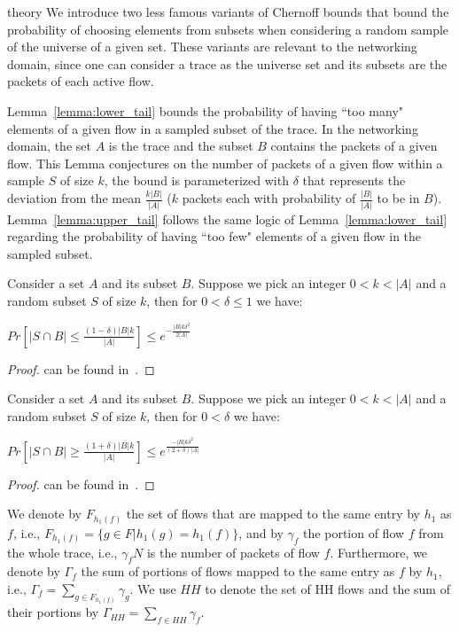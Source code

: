 \begin{maybeappendix}{theory}
We introduce two less famous variants of Chernoff bounds that bound the probability of choosing elements from subsets when considering a random sample of the universe of a given set. These variants are relevant to the networking domain, since one can consider a trace as the universe set and its subsets are the packets of each active flow.

Lemma~\ref{lemma:lower_tail} bounds the probability of having ``too many" elements of a given flow in a sampled subset of the trace. In the networking domain, the set $A$ is the trace and the subset $B$ contains the packets of a given flow. This Lemma conjectures on the number of packets of a given flow within a sample $S$ of size $k$, the bound is parameterized with $\delta$ that represents the deviation from the mean $\frac{k|B|}{|A|}$ ($k$ packets each with probability of $\frac{|B|}{|A|}$ to be in $B$). Lemma~\ref{lemma:upper_tail} follows the same logic of Lemma~\ref{lemma:lower_tail} regarding the probability of having ``too few" elements of a given flow in the sampled subset.

\begin{lemma}
\label{lemma:lower_tail}
Consider a set $A$ and its subset $B$. Suppose we pick an integer $0<k<|A|$ and a random subset $S$ of size $k$, then for $0<\delta \leq 1$ we have:

$Pr\left[|S \cap B| \leq \frac{(1-\delta)|B|k}{|A|}\right] \leq e^{-\frac{|B|k\delta^2}{2|A|}}$
\end{lemma}
\begin{proof}
can be found in~\cite{bounds}.
\end{proof}

\begin{lemma}
\label{lemma:upper_tail}
Consider a set $A$ and its subset $B$. Suppose we pick an integer $0<k<|A|$ and a random subset $S$ of size $k$, then for $0<\delta$ we have:

$Pr\left[|S \cap B| \geq \frac{(1+\delta)|B|k}{|A|}\right] \leq e^{\frac{-|B|k\delta^2}{(2+\delta)|A|}}$
\end{lemma}
\begin{proof}
can be found in~\cite{bounds2}.
\end{proof}

\end{maybeappendix}

We denote by $F_{h_1(f)}$ the set of flows that are mapped to the same entry by $h_1$ as $f$, i.e., $F_{h_1(f)} = \{g\in F | h_1(g)=h_1(f)\}$, and by $\gamma_f$ the portion of flow $f$ from the whole trace, i.e., $\gamma_f N$ is the number of packets of flow $f$. Furthermore, we denote by $\Gamma_f$ the sum of portions of flows mapped to the same entry as $f$ by $h_1$, i.e., $\Gamma_f=\sum_{g\in F_{h_1(f)}} \gamma_g$. We use $HH$ to denote the set of HH flows and the sum of their portions by $\Gamma_{HH}=\sum_{f \in HH}\gamma_f$.

